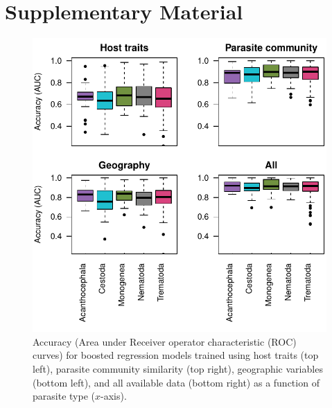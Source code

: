 \documentclass[12pt]{article}
\begin{document}
 
 
 


\newpage
\section{Supplementary Material}

\begin{figure}[h]
  \includegraphics[width=\textwidth]{Figures/parAccuracy.pdf}
  \caption{Accuracy (Area under Receiver operator characteristic (ROC) curves) for boosted regression models trained using host traits (top left), parasite community similarity (top right), geographic variables (bottom left), and all available data (bottom right) as a function of parasite type ($x$-axis).   }
 \label{fig:parAUC}
 \end{figure}

 
 
\end{document}
